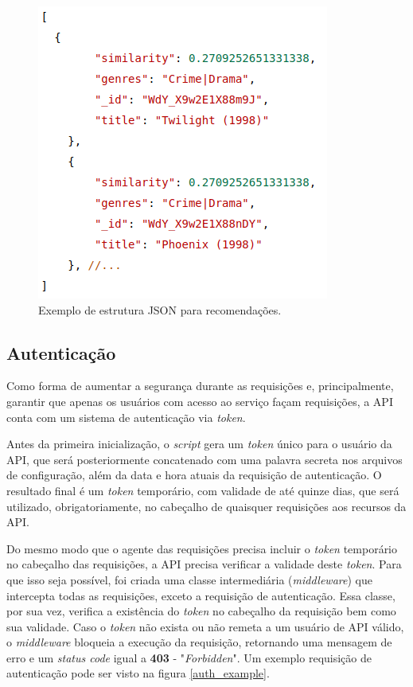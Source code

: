 \documentclass[12pt, openright, oneside, a4paper, brazil]{abntex2}
\begin{document}
\begin{figure}[h!tp]

	\caption{\label{json_example}Exemplo de estrutura JSON para recomendações.}

	\begin{center}
		\includegraphics[scale=0.75]{images/json_example.png}
	\end{center}

	\hspace{5.5cm}{Fonte: O Autor.}

\end{figure}

\subsection{Autenticação} \label{autenticacao}

Como forma de aumentar a segurança durante as requisições e, principalmente, garantir que apenas os usuários com acesso ao serviço façam requisições, a API conta com um sistema de autenticação via \textit{token}.

Antes da primeira inicialização, o \textit{script} gera um \textit{token} único para o usuário da API, que será posteriormente concatenado com uma palavra secreta nos arquivos de configuração, além da data e hora atuais da requisição de autenticação. O resultado final é um \textit{token} temporário, com validade de até quinze dias, que será utilizado, obrigatoriamente, no cabeçalho de quaisquer requisições aos recursos da API.

Do mesmo modo que o agente das requisições precisa incluir o \textit{token} temporário no cabeçalho das requisições, a API precisa verificar a validade deste \textit{token}. Para que isso seja possível, foi criada uma classe intermediária (\textit{middleware}) que intercepta todas as requisições, exceto a requisição de autenticação. Essa classe, por sua vez, verifica a existência do \textit{token} no cabeçalho da requisição bem como sua validade. Caso o \textit{token} não exista ou não remeta a um usuário de API válido, o \textit{middleware} bloqueia a execução da requisição, retornando uma mensagem de erro e um \textit{status code} igual a \textbf{403} - "\textit{Forbidden}". Um exemplo requisição de autenticação pode ser visto na figura \ref{auth_example}.
\end{document}
